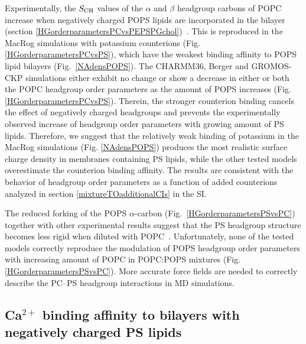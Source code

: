 \documentclass[journal=jpcbfk,manuscript=article]{achemso}
\begin{document}
Experimentally, the $S_{\rm{CH}}$ values of the $\alpha$ and $\beta$ headgroup carbons of POPC increase when negatively charged POPS lipids are incorporated in the bilayer 
(section \ref{HGorderparametersPCvsPEPSPGchol})~\cite{seelig87,scherer87}.
This is reproduced in the MacRog simulations with potassium counterions (Fig. \ref{HGorderparametersPCvsPS}),
which have the weakest binding affinity to POPS lipid bilayers (Fig.~\ref{NAdensPOPS}).
The CHARMM36, Berger and GROMOS-CKP simulations either exhibit no change or show a decrease
in either or both the POPC headgroup order parameters as the amount of POPS increases (Fig. \ref{HGorderparametersPCvsPS}).
Therein, the stronger counterion binding cancels
the effect of negatively charged headgroups and prevents the experimentally observed
increase of headgroup order parameters with growing amount of PS lipids.
Therefore, we suggest that the relatively weak binding of potassium
in the MacRog simulations (Fig. \ref{NAdensPOPS}) produces the most
realistic surface charge density in membranes containing PS lipids,
while the other tested models overestimate the counterion
binding affinity. The results are consistent with the behavior of headgroup order
parameters as a function of added counterions analyzed in section \ref{mixtureTOadditionalCIs}
in the SI.

The reduced forking of the POPS $\alpha$-carbon (Fig.~\ref{HGorderparametersPSvsPC})
together with other experimental results suggest that the PS headgroup structure becomes less rigid when diluted with
POPC~\cite{browning80,buldt81,roux90,roux91,scherer87}.
Unfortunately, none of the tested models correctly reproduce the modulation of POPS headgroup order
parameters with increasing amount of POPC in POPC:POPS mixtures (Fig. \ref{HGorderparametersPSvsPC}).
More accurate force fields are needed
to correctly describe the PC--PS headgroup interactions in MD simulations.

\subsection{Ca$^{2+}$ binding affinity to bilayers with negatively charged PS lipids}
\end{document}
